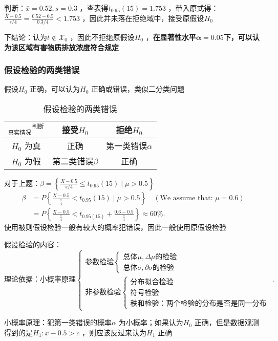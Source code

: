 判断：$\bar{x}=0.52,s=0.3$ ，查表得$t_{0.95}\left( 15 \right)=1.753$ ，带入原式得：$\frac{\bar{X}-0.5}{s /4}=\frac{0.52-0.5}{0.3 /4}<1.753$ ，因此并未落在拒绝域中，接受原假设$H_0$

下结论：认为$t\not\in \mathscr{X}_0$ ，因此不拒绝原假设$H_0$ ，\textbf{在显著性水平}$\bm{\alpha=0.05}$\textbf{下，可以认为该区域有害物质排放浓度符合规定}
\subsubsection*{假设检验的两类错误}%
\label{subsub:假设检验的两类错误}
假设$H_0$ 正确，可以认为$H_0$ 正确或错误，类似二分类问题
\begin{table}[htpb]
    \centering
    \caption{假设检验的两类错误}
    \label{tab:假设检验的两类错误}
    \begin{tabular}{|c|c|c|}
    \hline
    $_\text{真实情况}\hspace{1pt}^\text{判断}$ & 接受$H_0$ & 拒绝$H_0$ \\
    \hline
    $H_0$ 为真 & 正确 & 第一类错误$\alpha$ \\
    \hline
    $H_0$ 为假 & 第二类错误$\beta$ & 正确\\
    \hline
    \end{tabular}
\end{table}

对于上题：$\beta=\left\{ \frac{X-0.5}{s /4}\le t_{0.95}\left( 15 \right) \mid \mu>0.5 \right\}$
\begin{align*}
    \beta&=P\left\{ \frac{X-0.5}{\frac{s}{4}}<t_{0.95}\left( 15 \right) \mid \mu>0.5 \right\} \quad \left( \text{We assume that: } \mu=0.6\right) \\
         &= P\left\{ \frac{X-0.5}{\frac{s}{4}}<t_{0.95\left( 15 \right)}+\frac{0.6-0.5}{\frac{s}{4}} \right\} \approx 60\%
.\end{align*}
使用被则假设检验一般有较大的概率犯错误，因此一般使用原假设检验

假设检验的内容：
\[
    \text{理论依据：小概率原理}
    \begin{cases}
        \text{参数检验}\begin{cases}
            \text{总体}\mu,\Delta\mu \text{的检验}\\
            \text{总体}\sigma,\partial\sigma \text{的检验}
        \end{cases}\\
        \text{非参数检验}\begin{cases}
            \text{分布拟合检验}\\
            \text{符号检验}\\
            \text{秩和检验：两个检验的分布是否是同一分布}
        \end{cases}
    \end{cases}
.\]
\begin{notation}
小概率原理：犯第一类错误的概率$\alpha$ 为小概率；如果认为$H_0$ 正确，但是数据观测得到的是$H_1:\bar{x}-0.5>c$ ，则应该反过来认为$H_1$ 正确
\end{notation}

